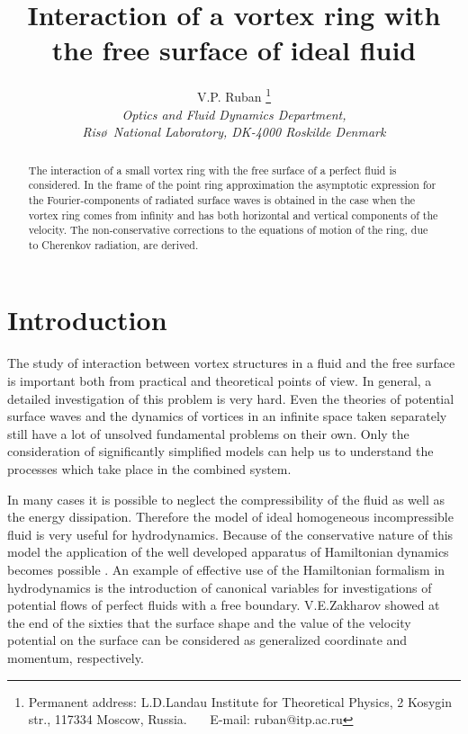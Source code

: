 \oddsidemargin  25pt
\evensidemargin 25pt
\topmargin -25pt
\textwidth 430pt
\textheight 670pt


\title{Interaction of a vortex ring with the free surface of ideal fluid}
\author{V.P. Ruban 
\footnote{Permanent address: L.D.Landau Institute for Theoretical Physics,
 2 Kosygin str., 117334 Moscow, Russia. ~~~E-mail: ruban@itp.ac.ru}\\
 {\it Optics and Fluid Dynamics Department,}\\
 {\it Ris\o ~National Laboratory, DK-4000 Roskilde Denmark}}

\maketitle
\begin{abstract}
The interaction of a small vortex ring with the free surface of a perfect fluid 
is considered. In the frame of the point ring approximation the asymptotic
expression for the Fourier-components of radiated surface waves is obtained
in the case when the vortex ring comes from infinity and has both horizontal 
and vertical components of the velocity. The non-conservative corrections 
to the equations of motion of the ring, due to Cherenkov radiation, are derived.
\end{abstract}

\section{Introduction}

The study of interaction  between vortex structures in a fluid and 
the free surface is important both from practical and theoretical points of 
view. In general, a detailed investigation of this problem is very hard. 
Even the theories of potential surface waves 
and the dynamics of vortices in an infinite space taken 
separately still have a lot of unsolved fundamental problems on their own.
Only the consideration of significantly simplified models can help us 
to understand the processes which take place in the combined system.

In many cases it is possible to neglect the compressibility of the fluid 
as well as the energy dissipation.
Therefore the model of ideal homogeneous incompressible fluid is very
useful for hydrodynamics. Because of the conservative nature of this model 
the application of the well developed apparatus of Hamiltonian dynamics
becomes possible  .  
An example of effective use of the Hamiltonian
formalism in hydrodynamics is the introduction of canonical
variables for investigations of potential flows of perfect fluids with a 
free boundary. V.E.Zakharov showed
at the end of the sixties  that the surface shape 
and the value of the velocity potential  on the surface can be
considered as generalized coordinate and momentum, respectively.


